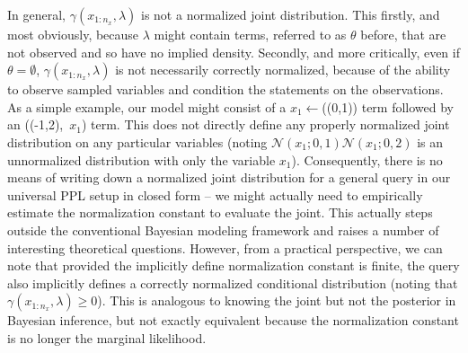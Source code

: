 In general, $\gamma(x_{1:n_x}, \lambda)$ is not a normalized joint distribution.  This firstly,
and most obviously, because $\lambda$ might contain terms, referred to as $\theta$ before, that are not
observed and so have no implied density.  Secondly, and more critically, even if $\theta = \emptyset$,
$\gamma(x_{1:n_x}, \lambda)$ is not necessarily correctly normalized, because of the ability to observe sampled variables and
condition the \sample statements on the observations.  As a simple example, our model
might consist of a $x_1 \leftarrow$\sample(\normal(0,1)) term followed by an \observe(\normal(-1,2),~$x_1$)
term.  This does not directly define any properly normalized joint distribution on any particular variables
(noting $\mathcal{N}(x_1;0,1) \mathcal{N}(x_1;0,2)$ is an unnormalized distribution with only the variable
$x_1$).  Consequently, there is no means of writing down a normalized joint distribution for a general
query in our universal PPL setup in closed form -- we might actually need to empirically estimate
the normalization constant to evaluate the joint.  This actually steps outside the conventional Bayesian
modeling framework and raises a number of interesting theoretical questions.  However, from a
practical perspective, we can note that provided the implicitly define normalization constant is finite,
the query also implicitly defines a correctly normalized conditional distribution (noting that
$\gamma(x_{1:n_x}, \lambda) \ge0$).
This is analogous to knowing the joint but not the posterior in Bayesian inference, but not exactly
equivalent because the normalization constant is no longer the marginal likelihood.

